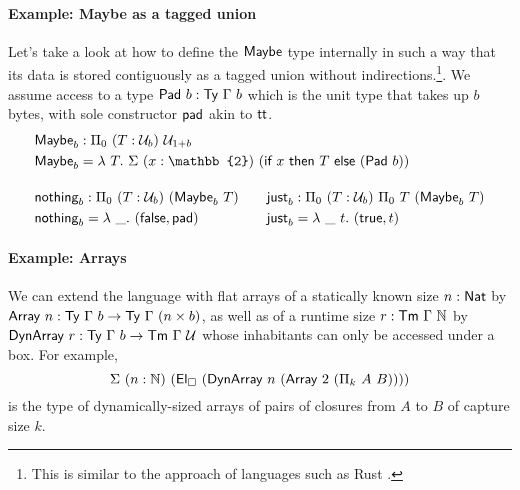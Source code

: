 \paragraph{Example: Maybe as a tagged union}\label{maybe-as-a-tagged-union}

Let's take a look at how to define the \(\textsf{Maybe}\) type internally in
such a way that its data is stored contiguously as a tagged union without indirections.\footnote{This
is similar to the approach of languages such as Rust \cite{rust-option}.}.
We assume access to a type $\textsf{Pad}\ b : \textsf{Ty}\ \Gamma\ b$ which is the unit
type that takes up $b$ bytes, with sole constructor $\textsf{pad}$ akin to
$\textsf{tt}$.
\[
\begin{aligned}
&\syn{Maybe}_b : \Pi_0\ (T : \univ_b)\ \univ_{1 + b} \\
&\syn{Maybe}_b = \lambda\ T.\ \Sigma\ (x : \mathbb{2})\ (\syn{if}\ x\ \syn{then}\ T\ \syn{else}\ (\syn{Pad}\ b)) \\[1em]
&\begin{alignedat}{2}
&\syn{nothing}_b : \Pi_0\ (T : \univ_b)\ (\syn{Maybe}_b\ T)  \qquad && \syn{just}_b : \Pi_0\ (T : \univ_b)\ \Pi_0\ T\ (\syn{Maybe}_b\ T) \\
&\syn{nothing}_b = \lambda\ \_ .\ (\syn{false}, \syn{pad}) && \syn{just}_b = \lambda\ \_\ t.\  (\syn{true}, t)
\end{alignedat}
\end{aligned}
\]

\paragraph{Example: Arrays}\label{arrays}

We can extend the language with flat arrays of a statically known size $n : \textsf{Nat}$ by
$\textsf{Array}\ n : \textsf{Ty}\ \Gamma\ b \to \textsf{Ty}\ \Gamma\ (n \times b)$, as well
as of a runtime size $r : \textsf{Tm}\ \Gamma\ \mathbb{N}$ by $\syn{DynArray}\ r : \Ty\ \Gamma\ b \to \Tm\ \Gamma\ \univ$
whose inhabitants can only be accessed under a box. For example,
\[
\Sigma\ (n : \mathbb{N})\ (\El_\square\ (\syn{DynArray}\ n\ (\syn{Array}\ 2\ (\Pi_k\ A\ B))))
\]
is the type of dynamically-sized arrays of pairs of closures from $A$ to $B$ of capture size $k$.
